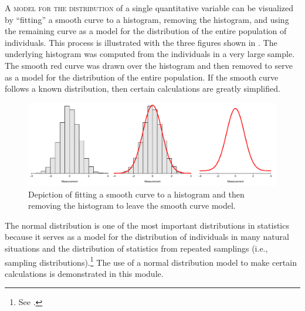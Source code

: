 \documentclass[10pt,openany]{book}\usepackage[]{graphicx}\usepackage[]{color}
\newenvironment{knitrout}{}{} %
\begin{document}
\minitoc
\newpage


\lettrine{A}{ model for the distribution} of a single quantitative variable can be visualized by ``fitting'' a smooth curve to a histogram, removing the histogram, and using the remaining curve as a model for the distribution of the entire population of individuals.  This process is illustrated with the three figures shown in .  The underlying histogram was computed from the individuals in a very large sample.  The smooth red curve was drawn over the histogram and then removed to serve as a model for the distribution of the entire population.  If the smooth curve follows a known distribution, then certain calculations are greatly simplified.

\begin{knitrout}
\color{fgcolor}\begin{figure}[hbtp]

{\centering \includegraphics[width=.95\linewidth]{Figs/NormDensityEx-1} 

}

\caption[Depiction of fitting a smooth curve to a histogram and then removing the histogram to leave the smooth curve model]{Depiction of fitting a smooth curve to a histogram and then removing the histogram to leave the smooth curve model.}\label{fig:NormDensityEx}
\end{figure}


\end{knitrout}

The normal distribution is one of the most important distributions in statistics because it serves as a model for the distribution of individuals in many natural situations and the distribution of statistics from repeated samplings (i.e., sampling distributions).\footnote{See .}  The use of a normal distribution model to make certain calculations is demonstrated in this module.
\end{document}
